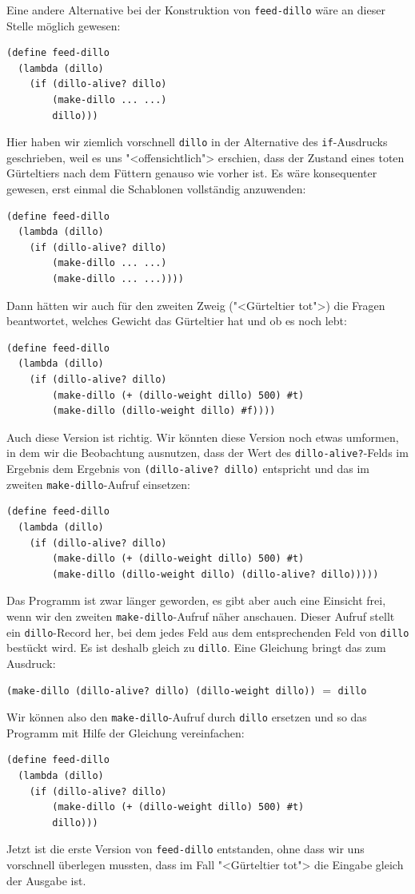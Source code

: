 Eine andere Alternative bei der Konstruktion von \lstinline{feed-dillo}
wäre an dieser Stelle möglich gewesen:
%
\begin{lstlisting}
(define feed-dillo
  (lambda (dillo)
    (if (dillo-alive? dillo)
        (make-dillo ... ...)
        dillo)))
\end{lstlisting}
%
Hier haben wir ziemlich vorschnell \lstinline{dillo} in der Alternative des
\lstinline{if}-Ausdrucks geschrieben, weil es uns "<offensichtlich"> erschien, dass
der Zustand eines toten Gürteltiers nach dem Füttern genauso wie
vorher ist.  Es wäre konsequenter gewesen, erst einmal die Schablonen
vollständig anzuwenden:
%
\begin{lstlisting}
(define feed-dillo
  (lambda (dillo)
    (if (dillo-alive? dillo)
        (make-dillo ... ...)
        (make-dillo ... ...))))
\end{lstlisting}
%
Dann hätten wir auch für den zweiten Zweig ("<Gürteltier tot">) die Fragen beantwortet,
welches Gewicht das Gürteltier hat und ob es noch lebt:
%
\begin{lstlisting}
(define feed-dillo
  (lambda (dillo)
    (if (dillo-alive? dillo)
        (make-dillo (+ (dillo-weight dillo) 500) #t)
        (make-dillo (dillo-weight dillo) #f))))
\end{lstlisting}
%
Auch diese Version ist richtig.  Wir könnten diese Version noch etwas
umformen, in dem wir die Beobachtung ausnutzen, dass der Wert des
\lstinline{dillo-alive?}-Felds im Ergebnis dem Ergebnis von
\lstinline{(dillo-alive? dillo)} entspricht und das im zweiten
\lstinline{make-dillo}-Aufruf einsetzen:
%
\begin{lstlisting}
(define feed-dillo
  (lambda (dillo)
    (if (dillo-alive? dillo)
        (make-dillo (+ (dillo-weight dillo) 500) #t)
        (make-dillo (dillo-weight dillo) (dillo-alive? dillo)))))
\end{lstlisting}
%
Das Programm ist zwar länger geworden, es gibt aber auch eine Einsicht
frei, wenn wir den zweiten \lstinline{make-dillo}-Aufruf näher anschauen.
Dieser Aufruf stellt ein \lstinline{dillo}-Record her, bei dem jedes Feld
aus dem entsprechenden Feld von \lstinline{dillo} bestückt wird.  Es ist
deshalb gleich zu \lstinline{dillo}.  Eine Gleichung bringt das zum Ausdruck:
%
\begin{center}
  \lstinline{(make-dillo (dillo-alive? dillo) (dillo-weight dillo))} $=$ \lstinline{dillo}
\end{center}
%
Wir können also den \lstinline{make-dillo}-Aufruf durch \lstinline{dillo}
ersetzen und so das Programm mit Hilfe der Gleichung vereinfachen:
%
\begin{lstlisting}
(define feed-dillo
  (lambda (dillo)
    (if (dillo-alive? dillo)
        (make-dillo (+ (dillo-weight dillo) 500) #t)
        dillo)))
\end{lstlisting}
%
Jetzt ist die erste Version von \lstinline{feed-dillo} entstanden, ohne
dass wir uns vorschnell überlegen mussten, dass im Fall "<Gürteltier
tot"> die Eingabe gleich der Ausgabe ist.

